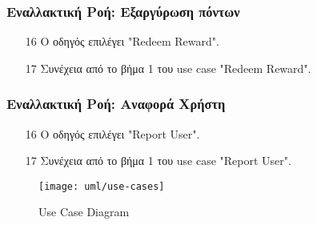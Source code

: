 \subsubsection{Εναλλακτική Ροή: Εξαργύρωση πόντων}

\begin{enumerate}
    \item[16] Ο οδηγός επιλέγει "Redeem Reward".
    \item[17] Συνέχεια από το βήμα 1 του use case "Redeem Reward".
\end{enumerate}

\subsubsection{Εναλλακτική Ροή: Αναφορά Χρήστη}

\begin{enumerate}
    \item[16] Ο οδηγός επιλέγει "Report User".
    \item[17] Συνέχεια από το βήμα 1 του use case "Report User".
\end{enumerate}

\newpage

\begin{figure}
    \centering
    \texttt{[image: uml/use-cases]}
    \caption{Use Case Diagram}
\end{figure}



